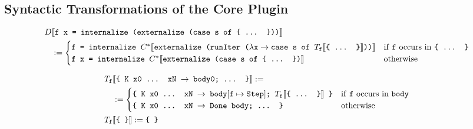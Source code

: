 \documentclass[sigplan,screen]{acmart}
\newcommand{\expr}[1]{\llbracket#1\rrbracket} %
\newcommand{\rarr}{\rightarrow}
\newcommand{\ttt}{\texttt}
\begin{document}

\clearpage
\subsection{Syntactic Transformations of the Core Plugin}

\begin{align*}
  D&\expr{\ttt{f x = internalize (externalize (case s of \{ ... \}))}}\\
      &:= \begin{cases}
        \ttt{f = internalize $C^{*}\expr{\ttt{externalize (runIter ($\lambda \ttt{x} \rarr \ttt{case s of $T_{\ttt{f}}\expr{\ttt{\{ ... \}}}$}$))}}$} & \text{if \ttt{f} occurs in \ttt{\{ ... \}}}\\
        \ttt{f x = internalize $C^{*}\expr{\ttt{externalize (case s of \{ ... \})}}$} & \text{otherwise}
      \end{cases}\\
\end{align*}

\begin{align*}
  T_{\ttt{f}}&\expr{\ttt{\{ K x0 ... xN $\rarr$ body0; ... \}}} := \\
    &:=
      \begin{cases}
        \ttt{\{ K x0 ... xN $\rarr$ body}[\ttt{f} \mapsto \ttt{Step}]\ttt{; }T_{\ttt{f}}\expr{\ttt{\{ ... \}}}\ttt{ \}} & \text{if \ttt{f} occurs in \ttt{body}}\\
        \ttt{\{ K x0 ... xN $\rarr$ Done body; ... \}} & \text{otherwise}
      \end{cases}\\
  T_{\ttt{f}}&\expr{\ttt{\{ \}}} := \ttt{\{ \}}\\
\end{align*}
\end{document}
